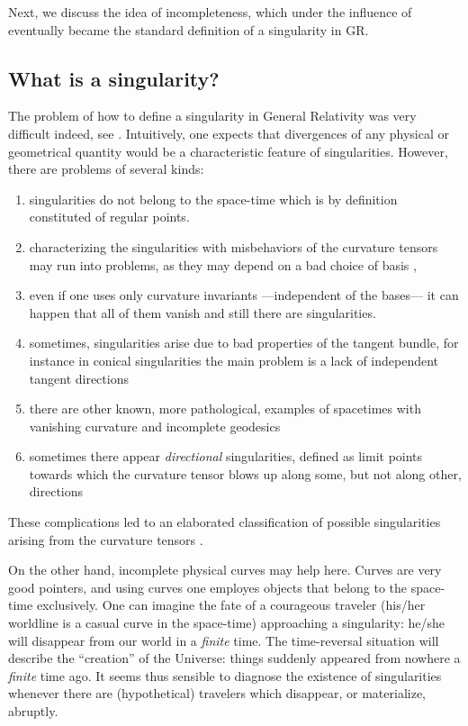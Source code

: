 \documentclass[12pt]{iopart}
\begin{document}
Next, we discuss the idea of incompleteness, which under the influence of \cite{P} eventually became the standard definition of a singularity in GR.



\subsection{What is a singularity?}\label{subsec:singularities}
The problem of how to define a singularity in 
General Relativity was very difficult indeed, see \cite{Ge2,RSh}.
Intuitively, one expects that divergences of any physical or 
geometrical quantity would be a characteristic feature of singularities. 
However, there are problems of several kinds: 
\begin{enumerate}
\item singularities do not belong to the space-time which is by definition constituted of regular points. 
\item characterizing the singularities with misbehaviors of the curvature tensors may run into problems,
as they may depend on a bad choice of basis  \cite{ES}, 
\item even if one uses only curvature invariants ---independent 
of the bases--- it can happen that all of them vanish and still there 
are singularities.
\item sometimes, singularities arise due to bad properties of the tangent bundle, for instance in conical singularities the main problem is a lack of independent tangent directions \cite{ES,VS}
\item there are other known, more pathological, examples of spacetimes with vanishing curvature and incomplete geodesics \cite{Mis2,Mis}
\item sometimes there appear {\em directional} singularities, defined as limit points towards which the curvature tensor blows up along some, but not along other, directions \cite{St,GA,Ho,SS}
\end{enumerate}
These complications led to an elaborated classification of possible singularities arising from the curvature tensors \cite{ES}.

On the other hand, incomplete physical curves may help here. Curves are very good pointers, and using curves one  employes objects that belong to the space-time exclusively. One can imagine the fate of a courageous traveler (his/her worldline is a casual curve in the space-time) 
approaching a singularity: he/she will disappear from our world in a {\em finite} time. 
 The time-reversal situation will describe 
the ``creation'' of the Universe: things suddenly appeared from 
nowhere a {\em finite} time ago. 
It seems thus sensible  to
diagnose the existence of singularities whenever there are (hypothetical) travelers 
which disappear, or materialize, abruptly.
\end{document}
